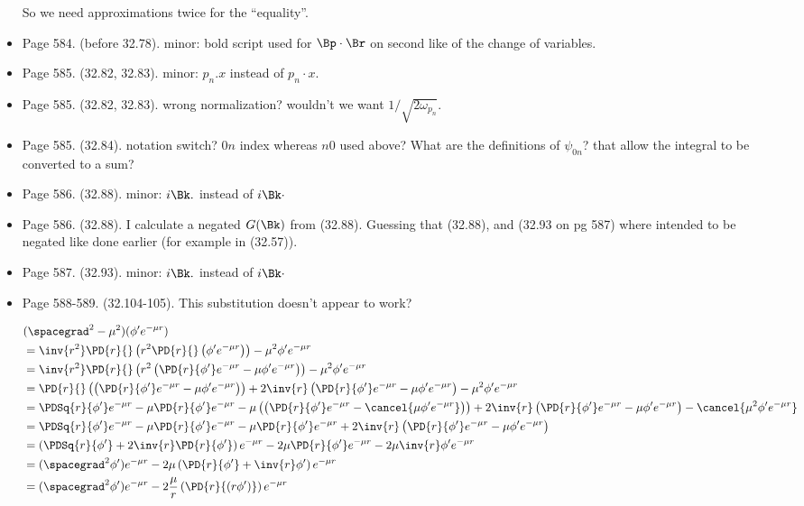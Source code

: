 \begin{itemize}
So we need approximations twice for the ``equality''.

\item Page 584.  (before 32.78).  minor: bold script used for $\Bp \cdot \Br$ on second like of the change of variables.
\item Page 585.  (32.82, 32.83).  minor: $p_n . x$ instead of $p_n \cdot x$.
\item Page 585.  (32.82, 32.83).  wrong normalization?  wouldn't we want $1/\sqrt{2 \omega_{p_n}}$.
\item Page 585.  (32.84).  notation switch?  $0n$ index whereas $n0$ used above?  What are the definitions of $\psi_{0n}$? that allow the integral to be converted to a sum?
\item Page 586.  (32.88).  minor: $i \Bk .$ instead of $i \Bk \cdot$
\item Page 586.  (32.88).  I calculate a negated $G(\Bk)$ from (32.88).  Guessing that (32.88), and (32.93 on pg 587) where intended to be negated like done earlier (for example in (32.57)). 
\item Page 587.  (32.93).  minor: $i \Bk .$ instead of $i \Bk \cdot$
\item Page 588-589.  (32.104-105).  This substitution doesn't appear to work?

\begin{align*}
&(\spacegrad^2 - \mu^2)(\phi' e^{-\mu r}) \\
&= \inv{r^2} \PD{r}{} \left( r^2 \PD{r}{} \left( \phi' e^{-\mu r} \right) \right) - \mu^2 \phi' e^{-\mu r} \\
&= \inv{r^2} \PD{r}{} \left( r^2 \left( \PD{r}{\phi'} e^{-\mu r} -\mu \phi' e^{-\mu r} \right) \right) - \mu^2 \phi' e^{-\mu r} \\
&= 
\PD{r}{} \left( \left( \PD{r}{\phi'} e^{-\mu r} -\mu \phi' e^{-\mu r} \right) \right) 
+ 2 \inv{r} \left( \PD{r}{\phi'} e^{-\mu r} -\mu \phi' e^{-\mu r} \right)  
- \mu^2 \phi' e^{-\mu r} \\
&= 
\PDSq{r}{\phi'} e^{-\mu r} -\mu \PD{r}{\phi'} e^{-\mu r} 
-\mu \left( \left( \PD{r}{\phi'} e^{-\mu r} - \cancel{\mu \phi' e^{-\mu r}} \right) \right) 
+ 2 \inv{r} \left( \PD{r}{\phi'} e^{-\mu r} -\mu \phi' e^{-\mu r} \right)  
- \cancel{\mu^2 \phi' e^{-\mu r}} \\
&=
\PDSq{r}{\phi'} e^{-\mu r} -\mu \PD{r}{\phi'} e^{-\mu r} 
-\mu \PD{r}{\phi'} e^{-\mu r} 
+ 2 \inv{r} \left( \PD{r}{\phi'} e^{-\mu r} -\mu \phi' e^{-\mu r} \right) 
\\
&=
\left( \PDSq{r}{\phi'} 
+ 2 \inv{r} \PD{r}{\phi'} \right) e^{-\mu r} 
-2 \mu \PD{r}{\phi'} e^{-\mu r} 
-2 \mu \inv{r} \phi' e^{-\mu r} 
\\
&=
(\spacegrad^2 \phi') e^{-\mu r}
- 2 \mu \left( \PD{r}{\phi'} + \inv{r} \phi' \right) e^{-\mu r} 
\\
&=
(\spacegrad^2 \phi') e^{-\mu r}
- 2 \frac{\mu}{r} \left( \PD{r}{(r \phi')} \right) e^{-\mu r} 
\\
\end{align*}


\end{itemize}
